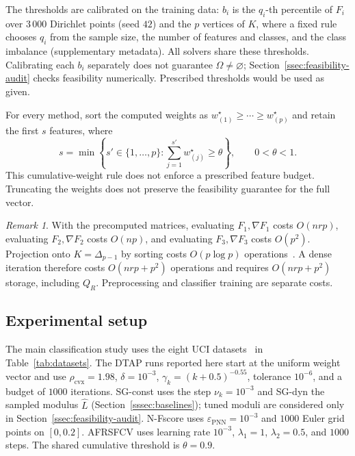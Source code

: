 \documentclass[]{interact}
\theoremstyle{plain}
\theoremstyle{definition}
\theoremstyle{remark}
\newtheorem{remark}{Remark}
\newcommand{\cvx}{\mathrm{cvx}}
\begin{document}
The thresholds are calibrated on the training data: $b_i$ is the $q_i$-th percentile of $F_i$ over $3\,000$ Dirichlet points (seed $42$) and the $p$ vertices of $K$, where a fixed rule chooses $q_i$ from the sample size, the number of features and classes, and the class imbalance (supplementary metadata). All solvers share these thresholds. Calibrating each $b_i$ separately does not guarantee $\Omega\ne\varnothing$; Section~\ref{ssec:feasibility-audit} checks feasibility numerically. Prescribed thresholds would be used as given.

For every method, sort the computed weights as $w^\star_{(1)}\ge\cdots\ge w^\star_{(p)}$ and retain the first $s$ features, where
\begin{equation}\label{eq:thetaRule}
s=\min\left\{s'\in\{1,\ldots,p\}:\sum_{j=1}^{s'}w^\star_{(j)}\ge\theta\right\},\qquad 0<\theta<1.
\end{equation}
This cumulative-weight rule does not enforce a prescribed feature budget. Truncating the weights does not preserve the feasibility guarantee for the full vector.

\begin{remark}\label{rem:fs-cost}
With the precomputed matrices, evaluating $F_1,\nabla F_1$ costs $O(nrp)$, evaluating $F_2,\nabla F_2$ costs $O(np)$, and evaluating $F_3,\nabla F_3$ costs $O(p^2)$. Projection onto $K=\Delta_{p-1}$ by sorting costs $O(p\log p)$ operations~\citep{condat2016simplex}. A dense iteration therefore costs $O(nrp+p^2)$ operations and requires $O(nrp+p^2)$ storage, including $Q_R$. Preprocessing and classifier training are separate costs.
\end{remark}

\subsection{Experimental setup}\label{ssec:setup}
The main classification study uses the eight UCI datasets~\citep{kelly2023uci} in Table~\ref{tab:datasets}. The DTAP runs reported here start at the uniform weight vector and use $\rho_{\cvx}=1.98$, $\delta=10^{-3}$, $\gamma_k=(k+0.5)^{-0.55}$, tolerance $10^{-6}$, and a budget of $1000$ iterations. SG-const uses the step $\nu_k=10^{-3}$ and SG-dyn the sampled modulus $\widehat L$ (Section~\ref{sssec:baselines}); tuned moduli are considered only in Section~\ref{ssec:feasibility-audit}. N-Fscore uses $\varepsilon_{\mathrm{PNN}}=10^{-3}$ and $1000$ Euler grid points on $[0,0.2]$. AFRSFCV uses learning rate $10^{-3}$, $\lambda_1=1$, $\lambda_2=0.5$, and $1000$ steps. The shared cumulative threshold is $\theta=0.9$.
\end{document}
